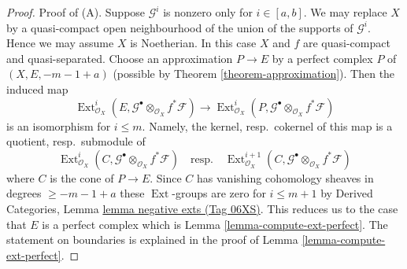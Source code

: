 \documentclass{amsart}
\theoremstyle{plain}
\theoremstyle{definition}
\theoremstyle{remark}
\numberwithin{equation}{subsection}
\def\Ext{\mathop{\mathrm{Ext}}\nolimits}
\begin{document}
\begin{proof}
Proof of (A).
Suppose $\mathcal{G}^i$ is nonzero only for $i \in [a, b]$.
We may replace $X$ by a quasi-compact open neighbourhood of
the union of the supports of $\mathcal{G}^i$.
Hence we may assume $X$ is Noetherian.
In this case $X$ and $f$ are quasi-compact and quasi-separated.
Choose an approximation $P \to E$ by a perfect complex $P$ of
$(X, E, -m - 1 + a)$
(possible by Theorem \ref{theorem-approximation}).
Then the induced map
$$
\Ext^i_{\mathcal{O}_X}(E,
\mathcal{G}^\bullet \otimes_{\mathcal{O}_X} f^*\mathcal{F})
\longrightarrow
\Ext^i_{\mathcal{O}_X}(P,
\mathcal{G}^\bullet \otimes_{\mathcal{O}_X} f^*\mathcal{F})
$$
is an isomorphism for $i \leq m$. Namely, the kernel, resp.\ cokernel of this
map is a quotient, resp.\ submodule of
$$
\Ext^i_{\mathcal{O}_X}(C,
\mathcal{G}^\bullet \otimes_{\mathcal{O}_X} f^*\mathcal{F})
\quad\text{resp.}\quad
\Ext^{i + 1}_{\mathcal{O}_X}(C,
\mathcal{G}^\bullet \otimes_{\mathcal{O}_X} f^*\mathcal{F})
$$
where $C$ is the cone of $P \to E$. Since $C$ has vanishing cohomology
sheaves in degrees $\geq -m - 1 + a$ these $\Ext$-groups are zero
for $i \leq m + 1$ by
Derived Categories, Lemma \href{https://stacks.math.columbia.edu/tag/06XS}{lemma negative exts (Tag 06XS)}.
This reduces us to the case that
$E$ is a perfect complex which is Lemma \ref{lemma-compute-ext-perfect}.
The statement on boundaries is explained in the proof of
Lemma \ref{lemma-compute-ext-perfect}.


\end{proof}
\end{document}
